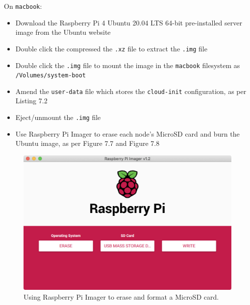 \documentclass{report}
\begin{document}
On \verb|macbook|:

\begin{itemize}
  \item Download the Raspberry Pi 4 Ubuntu 20.04 LTS 64-bit pre-installed server image from the Ubuntu website
  \item Double click the compressed the \verb|.xz| file to extract the \verb|.img| file
  \item Double click the \verb|.img| file to mount the image in the \verb|macbook| filesystem as \verb|/Volumes/system-boot|
  \item Amend the \verb|user-data| file which stores the \verb|cloud-init| configuration, as per Listing 7.2
  \item Eject/unmount the \verb|.img| file
  \item Use Raspberry Pi Imager to erase each node's MicroSD card and burn the Ubuntu image, as per Figure 7.7 and Figure 7.8
\end{itemize}

\lstset{style=listing, float=H}


\begin{figure}[H]
	\centering	
	\includegraphics[width=1.0\textwidth]{screenshots/imager-erase.png}
	\caption{Using Raspberry Pi Imager to erase and format a MicroSD card.}
\end{figure}
\end{document}
